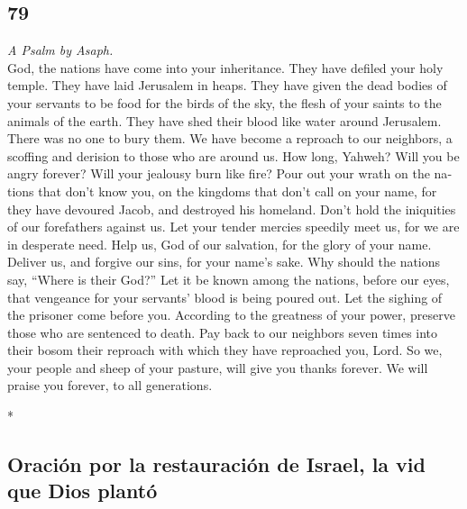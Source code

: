\begin{paracol}{2}
\switchcolumn
\begin{otherlanguage}{english}

\hypertarget{section-157}{%
\section{79}\label{section-157}}

\emph{A Psalm by Asaph.}\\
 God, the nations have come into your inheritance. They
have defiled your holy temple. They have laid Jerusalem in heaps.
 They have given the dead bodies of your servants to be
food for the birds of the sky, the flesh of your saints to the animals
of the earth.  They have shed their blood like water
around Jerusalem. There was no one to bury them.  We have
become a reproach to our neighbors, a scoffing and derision to those who
are around us.  How long, Yahweh? Will you be angry
forever? Will your jealousy burn like fire?  Pour out your
wrath on the nations that don't know you, on the kingdoms that don't
call on your name,  for they have devoured Jacob, and
destroyed his homeland.  Don't hold the iniquities of our
forefathers against us. Let your tender mercies speedily meet us, for we
are in desperate need.  Help us, God of our salvation, for
the glory of your name. Deliver us, and forgive our sins, for your
name's sake.  Why should the nations say, ``Where is
their God?'' Let it be known among the nations, before our eyes, that
vengeance for your servants' blood is being poured out. 
Let the sighing of the prisoner come before you. According to the
greatness of your power, preserve those who are sentenced to death.
 Pay back to our neighbors seven times into their bosom
their reproach with which they have reproached you, Lord.
 So we, your people and sheep of your pasture, will give
you thanks forever. We will praise you forever, to all generations.

\end{otherlanguage}

\switchcolumn[0]*

\hypertarget{oraciuxf3n-por-la-restauraciuxf3n-de-israel-la-vid-que-dios-plantuxf3}{%
\subsection{Oración por la restauración de Israel, la vid que Dios
plantó}\label{oraciuxf3n-por-la-restauraciuxf3n-de-israel-la-vid-que-dios-plantuxf3}}


\end{paracol}
